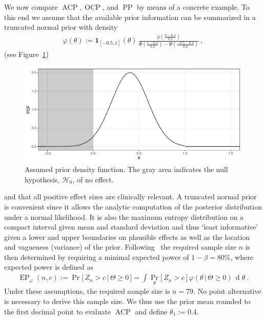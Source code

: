 \documentclass{article}
\renewcommand{\Pr}{\operatorname{Pr}}
\newcommand{\ACP}{\ensuremath{\operatorname{ACP}}}
\newcommand{\OCP}{\ensuremath{\operatorname{OCP}}}
\newcommand{\PP}{\ensuremath{\operatorname{PP}}}
\newcommand{\EP}{\ensuremath{\operatorname{EP}}}
\renewcommand{\Pr}{\ensuremath{\operatorname{Pr}}}
\begin{document}
We now compare $\ACP, \OCP$, and $\PP$ by means of a concrete example.
To this end we assume that the available prior information can be summarized in a truncated normal prior with density
\begin{align}
    \varphi(\theta) := \boldsymbol{1}_{[-0.5, 1]}(\theta)\,\frac{\displaystyle \phi\left(\frac{\theta - 0.4}{0.2}\right)}{\displaystyle \Phi\left(\frac{1 - 0.4}{0.2}\right) - \Phi\left(\frac{-0.5 - 0.4}{0.2}\right)} \ ,
\end{align}
(see Figure~\ref{fig:prior-pdf})
\begin{figure}
    \centering
    \includegraphics[width=\textwidth]{figures/prior_density}
    \caption{%
        Assumed prior density function. 
        The gray area indicates the null hypothesis, $\mathcal{H}_0$, of no effect. 
    }
    \label{fig:prior-pdf}
\end{figure}
and that all positive effect sizes are clinically relevant.
A truncated normal prior is convenient since it allows the analytic
computation of the posterior distribution under a normal likelihood.
It is also the maximum entropy distribution on a compact interval given mean and standard deviation and thus `least informative'
given a lower and upper boundaries on plausible effects as well as
the location and vagueness (variance) of the prior.
Following~\citep{kunzmann2020} the required 
sample size $n$ is then determined by requiring 
a minimal expected power of $1-\beta=80\%$, 
where expected power is defined as 
\begin{align}
    \EP_\varphi(n, c) :=
    \Pr\big[\,Z_n>c\,|\,\Theta\geq0\,\big] = \int \Pr_\theta\big[\,Z_n>c\,\big]\, \varphi(\theta\,|\,\Theta\geq0) \,\operatorname{d}\theta \ .
\end{align}
Under these assumptions, the required sample size is 
$n = 79$.
No point alternative is necessary to derive this sample size.
We thus use the prior mean rounded to the first decimal point to 
evaluate $\ACP$ and define $\theta_1:=0.4$.
\end{document}
